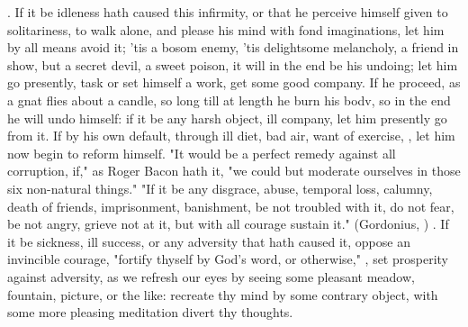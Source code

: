 {. If it be idleness hath caused this infirmity, or that he perceive himself given to solitariness, to walk alone, and please his mind with fond imaginations, let him by all means avoid it; 'tis a bosom enemy, 'tis delightsome melancholy, a friend in show, but a secret devil, a sweet poison, it will in the end be his undoing; let him go presently, task or set himself a work, get some good company. If he proceed, as a gnat flies about a candle, so long till at length he burn his bodv, so in the end he will undo himself: if it be any harsh object, ill company, let him presently go from it. If by his own default, through ill diet, bad air, want of exercise, \etc{}, let him now begin to reform himself. "It would be a perfect remedy against all corruption, if," as Roger Bacon hath it, "we could but moderate ourselves in those six non-natural things." "If it be any disgrace, abuse, temporal loss, calumny, death of friends, imprisonment, banishment, be not troubled with it, do not fear, be not angry, grieve not at it, but with all courage sustain it." (Gordonius, ) . If it be sickness, ill success, or any adversity that hath caused it, oppose an invincible courage, "fortify thyself by God's word, or otherwise," , set prosperity against adversity, as we refresh our eyes by seeing some pleasant meadow, fountain, picture, or the like: recreate thy mind by some contrary object, with some more pleasing meditation divert thy thoughts.

}
